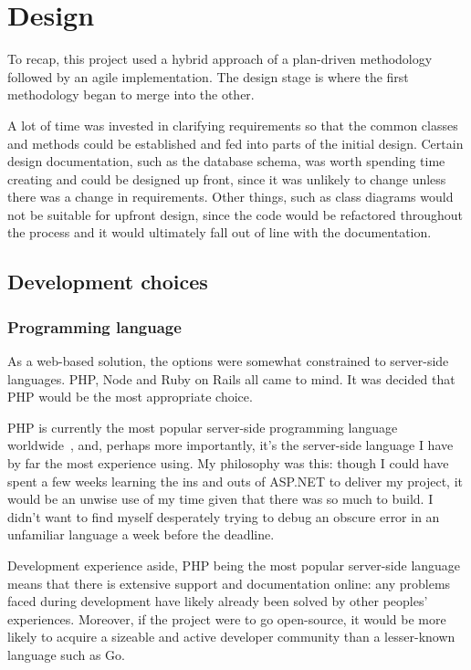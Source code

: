 \chapter{Design} %

To recap, this project used a hybrid approach of a plan-driven methodology followed by an agile implementation. The design stage is where the first methodology began to merge into the other.

A lot of time was invested in clarifying requirements so that the common classes and methods could be established and fed into parts of the initial design. Certain design documentation, such as the database schema, was worth spending time creating and could be designed up front, since it was unlikely to change unless there was a change in requirements. Other things, such as class diagrams would not be suitable for upfront design, since the code would be refactored throughout the process and it would ultimately fall out of line with the documentation.

\section{Development choices}

\subsection{Programming language}

As a web-based solution, the options were somewhat constrained to server-side languages. PHP, Node and Ruby on Rails all came to mind. It was decided that PHP would be the most appropriate choice.

PHP is currently the most popular server-side programming language worldwide~\cite{phpPopular}, and, perhaps more importantly, it's the server-side language I have by far the most experience using. My philosophy was this: though I could have spent a few weeks learning the ins and outs of ASP.NET to deliver my project, it would be an unwise use of my time given that there was so much to build. I didn't want to find myself desperately trying to debug an obscure error in an unfamiliar language a week before the deadline.

Development experience aside, PHP being the most popular server-side language means that there is extensive support and documentation online: any problems faced during development have likely already been solved by other peoples' experiences. Moreover, if the project were to go open-source, it would be more likely to acquire a sizeable and active developer community than a lesser-known language such as Go.

